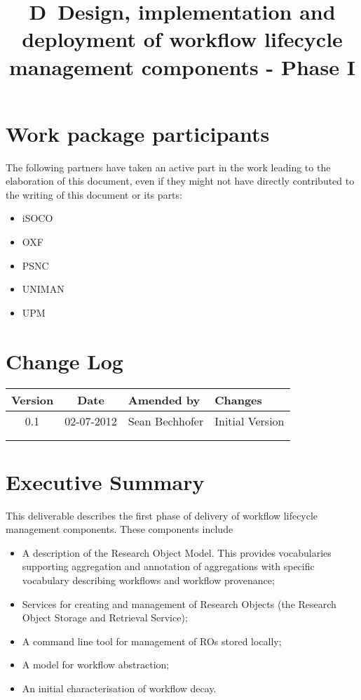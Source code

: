 \documentclass[a4paper, twoside, 11pt]{article}
\title{D\delid\ Design, implementation and deployment of workflow
  lifecycle management components - Phase I}
\begin{document}
\maketitle

\section*{Work package participants} The following partners have taken an active part in the work leading to the elaboration of this document, even if they might not have directly contributed to the writing of this document or its parts: %
\begin{itemize}
\item iSOCO
\item OXF
\item PSNC
\item UNIMAN
\item UPM
\end{itemize}

\section*{Change Log}
\begin{centering}

\begin{tabular}{|c|c|p{4.92cm}|p{6.5cm}|}

\hline \textbf{Version} & \textbf{Date} & \textbf{Amended by} & \textbf{Changes} \\ \hline
0.1 & 02-07-2012 & Sean Bechhofer & Initial Version \\ \hline
&&&\\ \hline
&&&\\ \hline

\end{tabular}

\end{centering}
\clearpage
\section*{Executive Summary}
This deliverable describes the first phase of delivery of workflow
lifecycle management components. These components include
\begin{itemize}
\item A description of the Research Object Model. This provides
  vocabularies supporting aggregation and annotation of aggregations
  with specific vocabulary describing workflows and workflow provenance;
\item Services for creating and management of Research Objects (the
  Research Object Storage and Retrieval Service);
\item A command line tool for management of ROs stored locally;
\item A model for workflow abstraction;
\item An initial characterisation of workflow decay.
\end{itemize}
\clearpage
\end{document}
